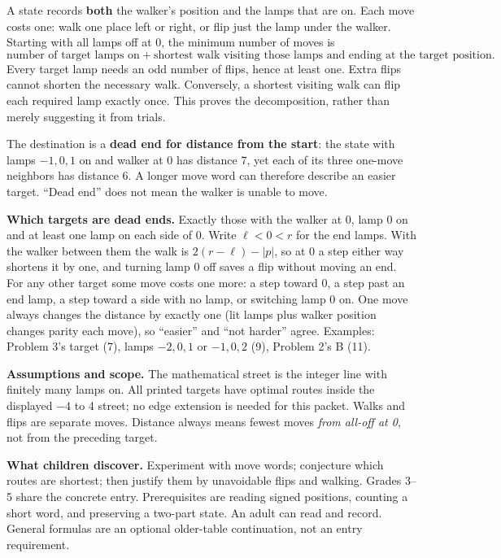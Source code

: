\documentclass[11pt,letterpaper]{article}
\newcommand{\heading}[1]{\par\vspace{5pt}{\large\bfseries #1}\par\nobreak}
\begin{document}
\heading{Mathematical destination}
A state records \textbf{both} the walker's position and the lamps that are on. Each move costs one: walk one place left or right, or flip just the lamp under the walker. Starting with all lamps off at 0, the minimum number of moves is
\[
\text{number of target lamps on}+
\text{shortest walk visiting those lamps and ending at the target position}.
\]
Every target lamp needs an odd number of flips, hence at least one. Extra flips cannot shorten the necessary walk. Conversely, a shortest visiting walk can flip each required lamp exactly once. This proves the decomposition, rather than merely suggesting it from trials.

The destination is a \textbf{dead end for distance from the start}: the state with lamps $-1,0,1$ on and walker at 0 has distance 7, yet each of its three one-move neighbors has distance 6. A longer move word can therefore describe an easier target. ``Dead end'' does not mean the walker is unable to move.

\textbf{Which targets are dead ends.} Exactly those with the walker at 0, lamp 0 on and at least one lamp on each side of 0. Write $\ell<0<r$ for the end lamps. With the walker between them the walk is $2(r-\ell)-|p|$, so at 0 a step either way shortens it by one, and turning lamp 0 off saves a flip without moving an end. For any other target some move costs one more: a step toward 0, a step past an end lamp, a step toward a side with no lamp, or switching lamp 0 on. One move always changes the distance by exactly one (lit lamps plus walker position changes parity each move), so ``easier'' and ``not harder'' agree. Examples: Problem 3's target (7), lamps $-2,0,1$ or $-1,0,2$ (9), Problem 2's B (11).

\textbf{Assumptions and scope.} The mathematical street is the integer line with finitely many lamps on. All printed targets have optimal routes inside the displayed $-4$ to 4 street; no edge extension is needed for this packet. Walks and flips are separate moves. Distance always means fewest moves \emph{from all-off at 0}, not from the preceding target.

\textbf{What children discover.} Experiment with move words; conjecture which routes are shortest; then justify them by unavoidable flips and walking. Grades 3--5 share the concrete entry. Prerequisites are reading signed positions, counting a short word, and preserving a two-part state. An adult can read and record. General formulas are an optional older-table continuation, not an entry requirement.
\end{document}
